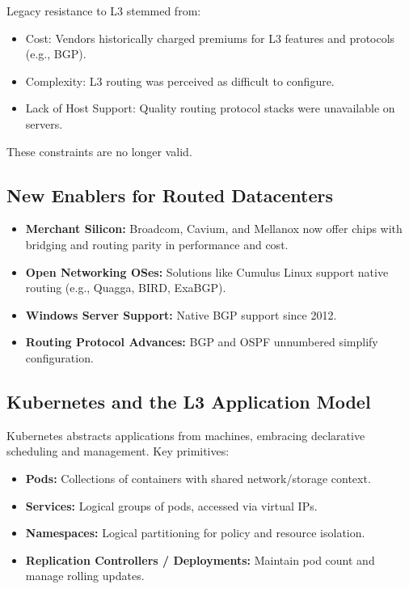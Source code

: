 \documentclass[../../../OAE-SPEC-MAIN.tex]{subfiles}
\begin{document}
Legacy resistance to L3 stemmed from:

\begin{itemize}
  \item Cost: Vendors historically charged premiums for L3 features and protocols (e.g., BGP).
  \item Complexity: L3 routing was perceived as difficult to configure.
  \item Lack of Host Support: Quality routing protocol stacks were unavailable on servers.
\end{itemize}

These constraints are no longer valid.

\subsection{New Enablers for Routed Datacenters}

\begin{itemize}
  \item \textbf{Merchant Silicon:} Broadcom, Cavium, and Mellanox now offer chips with bridging and routing parity in performance and cost.
  \item \textbf{Open Networking OSes:} Solutions like Cumulus Linux support native routing (e.g., Quagga, BIRD, ExaBGP).
  \item \textbf{Windows Server Support:} Native BGP support since 2012.
  \item \textbf{Routing Protocol Advances:} BGP and OSPF unnumbered simplify configuration.
\end{itemize}

\subsection{Kubernetes and the L3 Application Model}

Kubernetes abstracts applications from machines, embracing declarative scheduling and management. Key primitives:

\begin{itemize}
  \item \textbf{Pods:} Collections of containers with shared network/storage context.
  \item \textbf{Services:} Logical groups of pods, accessed via virtual IPs.
  \item \textbf{Namespaces:} Logical partitioning for policy and resource isolation.
  \item \textbf{Replication Controllers / Deployments:} Maintain pod count and manage rolling updates.
\end{itemize}
\end{document}

